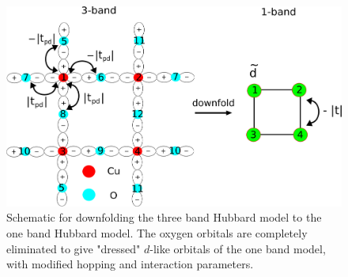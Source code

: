 \documentclass[prl,12pt,onecolumn,nofootinbib,notitlepage,english,superscriptaddress]{revtex4-1}
\begin{document}
\begin{figure}[htpb]
\centering
\includegraphics[width=1\linewidth]{./three_band_figure.pdf}
\caption{Schematic for downfolding the three band Hubbard model to the one band Hubbard model. 
The oxygen orbitals are completely eliminated to give "dressed" $d$-like orbitals of the one band model, with modified hopping 
and interaction parameters.}
\label{fig:threeband} 
\end{figure}	
\end{document}
